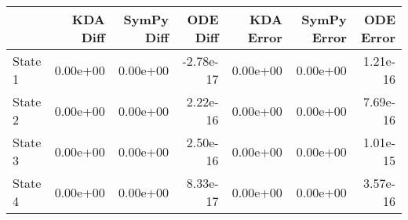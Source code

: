 \begin{tabular}{lrrrrrr}
\toprule
{} &  KDA Diff &  SymPy Diff &  ODE Diff &  KDA Error &  SymPy Error &  ODE Error \\
\midrule
State 1 &  0.00e+00 &    0.00e+00 & -2.78e-17 &   0.00e+00 &     0.00e+00 &   1.21e-16 \\
State 2 &  0.00e+00 &    0.00e+00 &  2.22e-16 &   0.00e+00 &     0.00e+00 &   7.69e-16 \\
State 3 &  0.00e+00 &    0.00e+00 &  2.50e-16 &   0.00e+00 &     0.00e+00 &   1.01e-15 \\
State 4 &  0.00e+00 &    0.00e+00 &  8.33e-17 &   0.00e+00 &     0.00e+00 &   3.57e-16 \\
\bottomrule
\end{tabular}

